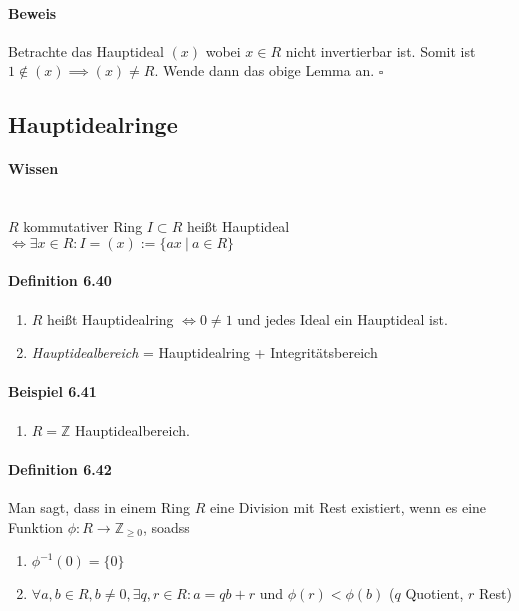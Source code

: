 \documentclass{scrartcl}
\begin{document}
\paragraph{Beweis}
Betrachte das Hauptideal $(x)$ wobei $x \in R$ nicht invertierbar ist. Somit ist
$1 \notin (x)\implies (x) \neq R$. Wende dann das obige Lemma an.
\hfill $\square$

\subsection*{Hauptidealringe}
\label{subsec:hauptidealbereiche}

\paragraph{Wissen} ~\\
$R$ kommutativer Ring $I \subset R$ heißt Hauptideal $\Leftrightarrow \exists x
\in R: I = (x) := \{ax ~|~ a \in R\}$

\paragraph{Definition 6.40}
\begin{enumerate}
\item $R$ heißt Hauptidealring $\Leftrightarrow 0 \neq 1$ und jedes Ideal ein
  Hauptideal ist.
\item \textit{Hauptidealbereich} = Hauptidealring + Integritätsbereich
\end{enumerate}

\paragraph{Beispiel 6.41}
\begin{enumerate}
\item $R = \mathbb{Z}$ Hauptidealbereich.
\end{enumerate}

\paragraph{Definition 6.42}
Man sagt, dass in einem Ring $R$ eine Division mit Rest existiert, wenn es eine
Funktion $\phi: R \to \mathbb{Z}_{\geq 0}$, soadss
\begin{enumerate}
\item $\phi^{-1}(0) = \{0\}$
\item $\forall a,b \in R, b \neq 0, \exists q,r \in R: a = qb + r$
  und $\phi(r) < \phi(b)$ ($q$ Quotient, $r$ Rest)
\end{enumerate}
\end{document}
